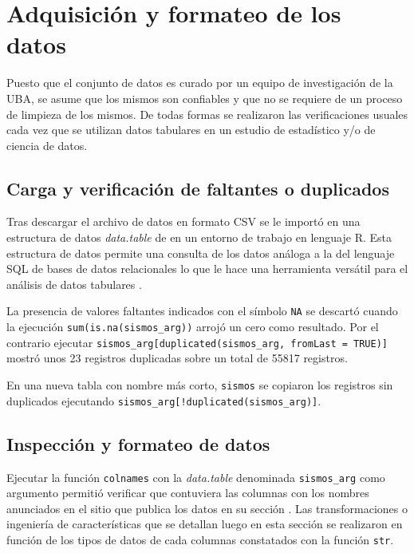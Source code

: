 \documentclass[a4paper]{report}
\begin{document}
\section{Adquisición y formateo de los datos}

Puesto que el conjunto de datos es curado por un equipo de investigación de la UBA, se asume que los mismos son confiables y que no se requiere de un proceso de limpieza de los mismos.
De todas formas se realizaron las verificaciones usuales cada vez que se utilizan datos tabulares en un estudio de estadístico y/o de ciencia de datos.


\subsection{Carga y verificación de faltantes o duplicados}
Tras descargar el archivo de datos en formato CSV se le importó en una estructura de datos \emph{data.table} de en un entorno de trabajo en lenguaje R.
Esta estructura de datos permite una consulta de los datos análoga a la del lenguaje SQL de bases de datos relacionales lo que le hace una herramienta versátil para el análisis de datos tabulares \cite{noauthor_introduction_2024}.

La presencia de valores faltantes indicados con el símbolo \verb'NA' se descartó cuando la ejecución \verb'sum(is.na(sismos_arg))' arrojó un cero como resultado.
Por el contrario ejecutar \verb'sismos_arg[duplicated(sismos_arg, fromLast = TRUE)]' mostró unos \num{23} registros duplicadas sobre un total de \num{55817} registros.

En una nueva tabla con nombre más corto, \verb'sismos' se copiaron los registros sin duplicados ejecutando \verb'sismos_arg[!duplicated(sismos_arg)]'.


\subsection{Inspección y formateo de datos}
Ejecutar la función \verb'colnames' con la \emph{data.table} denominada \verb'sismos_arg' como argumento permitió verificar que contuviera las columnas con los nombres anunciados en el sitio que publica los datos en su sección \cite[Exploración inicial]{daniela_parada_ic-datasets-docencia_nodate}.
Las transformaciones o ingeniería de características que se detallan luego en esta sección se realizaron en función de los tipos de datos de cada columnas constatados con la función \verb'str'.
\end{document}
